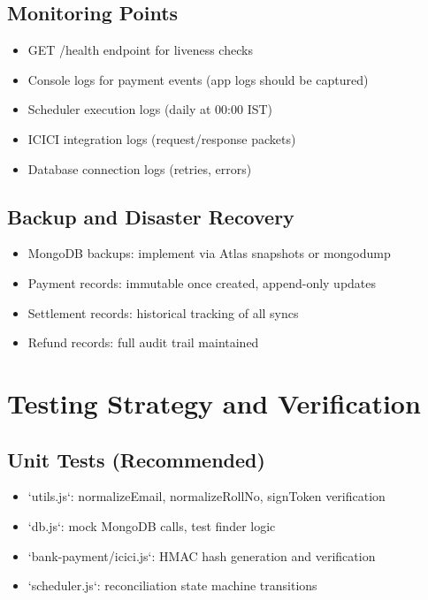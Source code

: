 \documentclass[12pt,a4paper]{article}
\begin{document}
\subsection{Monitoring Points}
\begin{itemize}
  \item GET /health endpoint for liveness checks
  \item Console logs for payment events (app logs should be captured)
  \item Scheduler execution logs (daily at 00:00 IST)
  \item ICICI integration logs (request/response packets)
  \item Database connection logs (retries, errors)
\end{itemize}

\subsection{Backup and Disaster Recovery}
\begin{itemize}
  \item MongoDB backups: implement via Atlas snapshots or mongodump
  \item Payment records: immutable once created, append-only updates
  \item Settlement records: historical tracking of all syncs
  \item Refund records: full audit trail maintained
\end{itemize}

\section{Testing Strategy and Verification}

\subsection{Unit Tests (Recommended)}
\begin{itemize}
  \item `utils.js`: normalizeEmail, normalizeRollNo, signToken verification
  \item `db.js`: mock MongoDB calls, test finder logic
  \item `bank-payment/icici.js`: HMAC hash generation and verification
  \item `scheduler.js`: reconciliation state machine transitions
\end{itemize}
\end{document}
